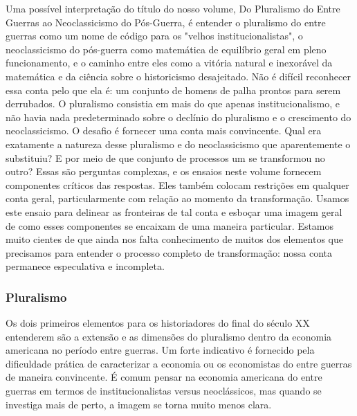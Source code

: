 \documentclass[a4paper,12pt]{article}[abntex2]
\begin{document}
Uma possível interpretação do título do nosso volume, Do Pluralismo do Entre Guerras ao Neoclassicismo do Pós-Guerra, é entender o pluralismo do entre guerras como um nome de código para os "velhos institucionalistas", o neoclassicismo do pós-guerra como matemática de equilíbrio geral em pleno funcionamento, e o caminho entre eles como a vitória natural e inexorável da matemática e da ciência sobre o historicismo desajeitado. Não é difícil reconhecer essa conta pelo que ela é: um conjunto de homens de palha prontos para serem derrubados. O pluralismo consistia em mais do que apenas institucionalismo, e não havia nada predeterminado sobre o declínio do pluralismo e o crescimento do neoclassicismo. O desafio é fornecer uma conta mais convincente. Qual era exatamente a natureza desse pluralismo e do neoclassicismo que aparentemente o substituiu? E por meio de que conjunto de processos um se transformou no outro? Essas são perguntas complexas, e os ensaios neste volume fornecem componentes críticos das respostas. Eles também colocam restrições em qualquer conta geral, particularmente com relação ao momento da transformação. Usamos este ensaio para delinear as fronteiras de tal conta e esboçar uma imagem geral de como esses componentes se encaixam de uma maneira particular. Estamos muito cientes de que ainda nos falta conhecimento de muitos dos elementos que precisamos para entender o processo completo de transformação: nossa conta permanece especulativa e incompleta.

\subsubsection{\textbf{Pluralismo}}

Os dois primeiros elementos para os historiadores do final do século XX entenderem são a extensão e as dimensões do pluralismo dentro da economia americana no período entre guerras. Um forte indicativo é fornecido pela dificuldade prática de caracterizar a economia ou os economistas do entre guerras de maneira convincente. É comum pensar na economia americana do entre guerras em termos de institucionalistas versus neoclássicos, mas quando se investiga mais de perto, a imagem se torna muito menos clara.
\end{document}
